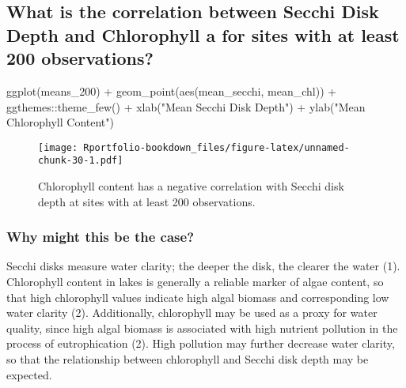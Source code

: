 \documentclass[
]{book}
\newenvironment{Shaded}{\begin{snugshade}}{\end{snugshade}}
\newcommand{\FunctionTok}[1]{\textcolor[rgb]{0.00,0.00,0.00}{#1}}
\newcommand{\NormalTok}[1]{#1}
\newcommand{\SpecialCharTok}[1]{\textcolor[rgb]{0.00,0.00,0.00}{#1}}
\newcommand{\StringTok}[1]{\textcolor[rgb]{0.31,0.60,0.02}{#1}}
\begin{document}
\hypertarget{what-is-the-correlation-between-secchi-disk-depth-and-chlorophyll-a-for-sites-with-at-least-200-observations}{%
\subsection{What is the correlation between Secchi Disk Depth and Chlorophyll a for sites with at least 200 observations?}\label{what-is-the-correlation-between-secchi-disk-depth-and-chlorophyll-a-for-sites-with-at-least-200-observations}}

\begin{Shaded}
\begin{Highlighting}[]
\FunctionTok{ggplot}\NormalTok{(means\_200) }\SpecialCharTok{+}
  \FunctionTok{geom\_point}\NormalTok{(}\FunctionTok{aes}\NormalTok{(mean\_secchi, mean\_chl)) }\SpecialCharTok{+}
\NormalTok{  ggthemes}\SpecialCharTok{::}\FunctionTok{theme\_few}\NormalTok{() }\SpecialCharTok{+} 
  \FunctionTok{xlab}\NormalTok{(}\StringTok{"Mean Secchi Disk Depth"}\NormalTok{) }\SpecialCharTok{+} \FunctionTok{ylab}\NormalTok{(}\StringTok{"Mean Chlorophyll Content"}\NormalTok{)}
\end{Highlighting}
\end{Shaded}

\begin{figure}
\centering
\texttt{[image: Rportfolio-bookdown\_files/figure-latex/unnamed-chunk-30-1.pdf]}
\caption{\label{fig:unnamed-chunk-30}Chlorophyll content has a negative correlation with Secchi disk depth at sites with at least 200 observations.}
\end{figure}

\hypertarget{why-might-this-be-the-case}{%
\subsubsection{Why might this be the case?}\label{why-might-this-be-the-case}}

Secchi disks measure water clarity; the deeper the disk, the clearer the water (1). Chlorophyll content in lakes is generally a reliable marker of algae content, so that high chlorophyll values indicate high algal biomass and corresponding low water clarity (2). Additionally, chlorophyll may be used as a proxy for water quality, since high algal biomass is associated with high nutrient pollution in the process of eutrophication (2). High pollution may further decrease water clarity, so that the relationship between chlorophyll and Secchi disk depth may be expected.
\end{document}
